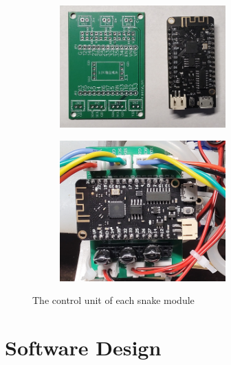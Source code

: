 \documentclass[twoside, 11pt]{article}
\begin{document}
\begin{figure}[H]
\centering
\begin{subfigure}[b]{0.45\linewidth}
	\centering
	\includegraphics[width=0.7\textwidth]{final_pcb}
\end{subfigure}
\begin{subfigure}[b]{0.45\linewidth}
	\centering
	\includegraphics[width=0.7\textwidth]{final_board}
\end{subfigure}
\caption{The control unit of each snake module}
\end{figure}
\section{Software Design}
\end{document}
